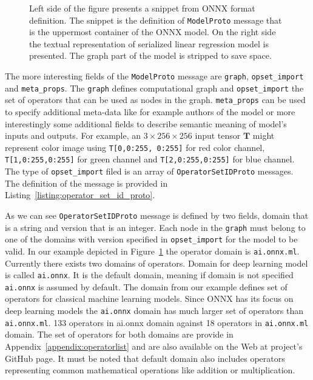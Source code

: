 \documentclass[english, 12pt, a4paper, elec, utf8, online]{aaltothesis}
\begin{document}
\begin{figure}[h!]
\begin{subfigure}[t]{0.6\textwidth}

\end{subfigure}
\begin{subfigure}[t]{0.6\textwidth}

\end{subfigure}

\caption{Left side of the figure presents a snippet from ONNX format definition. The snippet is the definition of \texttt{ModelProto} message that is the uppermost container of the ONNX model. On the right side the textual representation of serialized linear regression model is presented. The graph part of the model is stripped to save space.}\label{fig:ModelProto}
\end{figure}

The more interesting fields of the \texttt{ModelProto} message are \texttt{graph}, \texttt{opset\_import} and \texttt{meta\_props}. The \texttt{graph} defines computational graph and \texttt{opset\_import} the set of operators that can be used as nodes in the graph. \texttt{meta\_props} can be used to specify additional meta-data like for example authors of the model or more interestingly some additional fields to describe semantic meaning of model's inputs and outputs. For example, an $3 \times 256 \times 256$ input tensor $\mathbf{T}$ might represent color image using \texttt{T[0,0:255, 0:255]} for red color channel, \texttt{T[1,0:255,0:255]} for green channel and \texttt{T[2,0:255,0:255]} for blue channel. The type of \texttt{opset\_import} filed is an array of \texttt{OperatorSetIDProto} messages. The definition of the message is provided in Listing~\ref{listing:operator_set_id_proto}.
\newpage


As we can see \texttt{OperatorSetIDProto} message is defined by two fields, domain that is a string and version that is an integer. Each node in the \texttt{graph} must belong to one of the domains with version specified in \texttt{opset\_import} for the model to be valid. In our example depicted in Figure~\ref{fig:ModelProto} the operator domain is \texttt{ai.onnx.ml}.  Currently there exists two domains of operators. Domain for deep learning model is called \texttt{ai.onnx}. It is the default domain, meaning if domain is not specified \texttt{ai.onnx} is assumed by default. The domain from our example defines set of operators for classical machine learning models. Since ONNX has its focus on deep learning models the \texttt{ai.onnx} domain has much larger set of operators than \texttt{ai.onnx.ml}. 133 operators in ai.onnx domain against 18 operators in \texttt{ai.onnx.ml} domain. The set of operators for both domains are provide in Appendix~\ref{appendix:operatorlist} and are also available on the Web at project's GitHub page. It must be noted that default domain also includes operators representing common mathematical operations like addition or multiplication.  
\end{document}

